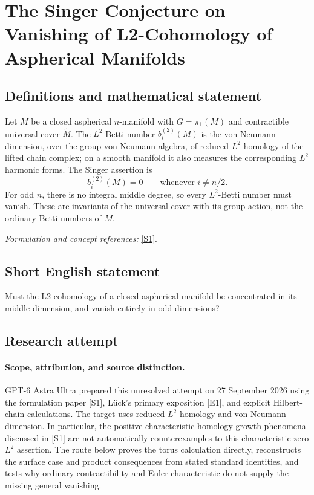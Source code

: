 \documentclass[11pt]{article}
\begin{document}
\section*{\texorpdfstring{The Singer Conjecture on Vanishing of L2-Cohomology of Aspherical Manifolds}{The Singer Conjecture on Vanishing of L2-Cohomology of Aspherical Manifolds}}\label{259}
\subsection{Definitions and mathematical statement}
Let $M$ be a closed aspherical $n$-manifold with $G=\pi_1(M)$ and contractible universal cover $\widetilde M$. The $L^2$-Betti number $b_i^{(2)}(M)$ is the von Neumann dimension, over the group von Neumann algebra, of reduced $L^2$-homology of the lifted chain complex; on a smooth manifold it also measures the corresponding $L^2$ harmonic forms. The Singer assertion is
\[
 b_i^{(2)}(M)=0\qquad\text{whenever }i\ne n/2.
\]
For odd $n$, there is no integral middle degree, so every $L^2$-Betti number must vanish. These are invariants of the universal cover with its group action, not the ordinary Betti numbers of $M$.
\par\smallskip\textit{Formulation and concept references:} \href{https://link.springer.com/article/10.1007/s00039-024-00667-w}{[S1]}.

\subsection{Short English statement}
Must the L2-cohomology of a closed aspherical manifold be concentrated in its middle dimension, and vanish entirely in odd dimensions?
\subsection{Research attempt}
\paragraph{Scope, attribution, and source distinction.}
GPT-6 Astra Ultra prepared this unresolved attempt on 27 September 2026
using the formulation paper [S1], L\"uck's primary exposition [E1], and
explicit Hilbert-chain calculations. The target uses reduced $L^2$
homology and von Neumann dimension. In particular, the positive-characteristic
homology-growth phenomena discussed in [S1] are not automatically
counterexamples to this characteristic-zero $L^2$ assertion. The route
below proves the torus calculation directly, reconstructs the surface
case and product consequences from stated standard identities, and
tests why ordinary contractibility and Euler characteristic do not
supply the missing general vanishing.
\end{document}
